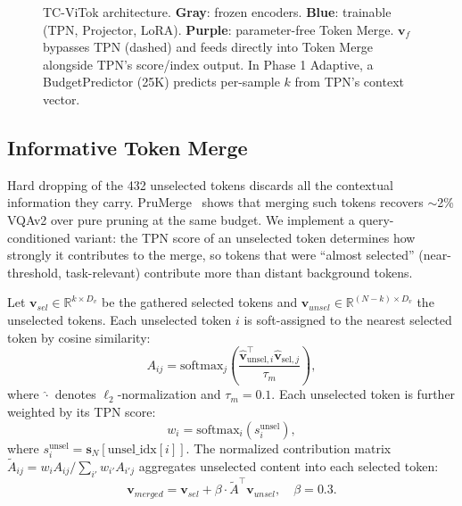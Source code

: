 \documentclass{article}
\newcommand{\vfine}{\mathbf{v}_{f}}
\newcommand{\sN}{\mathbf{s}_N}
\newcommand{\vsel}{\mathbf{v}_{sel}}
\newcommand{\vunsel}{\mathbf{v}_{unsel}}
\newcommand{\vmerged}{\mathbf{v}_{merged}}
\begin{document}
\begin{figure}[t]
\caption{TC-ViTok architecture. \textbf{Gray}: frozen encoders. \textbf{Blue}:
trainable (TPN, Projector, LoRA). \textbf{Purple}: parameter-free Token Merge.
$\vfine$ bypasses TPN (dashed) and feeds directly into Token Merge alongside
TPN's score/index output. In Phase 1 Adaptive, a BudgetPredictor (25K) predicts
per-sample $k$ from TPN's context vector.}
\label{fig:arch}
\end{figure}

\subsection{Informative Token Merge}
\label{sec:merge}

Hard dropping of the 432 unselected tokens discards all the contextual information
they carry.
PruMerge~\cite{shang2024llava} shows that merging such tokens recovers $\sim$2\%
VQAv2 over pure pruning at the same budget.
We implement a query-conditioned variant: the TPN score of an unselected token
determines how strongly it contributes to the merge, so tokens that were ``almost
selected'' (near-threshold, task-relevant) contribute more than distant background tokens.

Let $\vsel \in \mathbb{R}^{k \times D_v}$ be the gathered selected tokens and
$\vunsel \in \mathbb{R}^{(N-k) \times D_v}$ the unselected tokens.
Each unselected token $i$ is soft-assigned to the nearest selected token by cosine similarity:
\begin{equation}
  A_{ij} = \mathrm{softmax}_j
  \!\left(\frac{\hat{\mathbf{v}}_{\mathrm{unsel},i}^\top \hat{\mathbf{v}}_{\mathrm{sel},j}}
               {\tau_m}\right), \label{eq:assign}
\end{equation}
where $\hat{\cdot}$ denotes $\ell_2$-normalization and $\tau_m{=}0.1$.
Each unselected token is further weighted by its TPN score:
\begin{equation}
  w_i = \mathrm{softmax}_i(s_i^{\mathrm{unsel}}), \label{eq:scoreweight}
\end{equation}
where $s_i^{\mathrm{unsel}} = \sN[\mathrm{unsel\_idx}[i]]$.
The normalized contribution matrix $\tilde{A}_{ij} = w_i A_{ij} /
\!\sum_{i'} w_{i'} A_{i'j}$ aggregates unselected content into each selected token:
\begin{equation}
  \vmerged = \vsel + \beta \cdot \tilde{A}^\top \vunsel, \quad \beta = 0.3.
  \label{eq:merge}
\end{equation}
\end{document}
